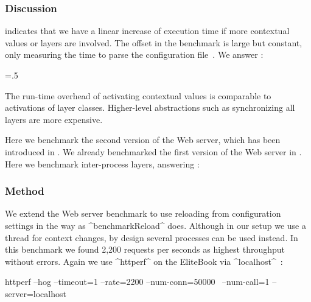 \subsubsection{Discussion}

 indicates that we have a linear increase of execution time if more contextual values or layers are involved.
The offset in the  benchmark is large but constant, only measuring the time to parse the configuration file~\cite{raab2016persistent}.
We answer :%
{\parfillskip=0pt \emergencystretch=.5\textwidth \par}
\rqEvaluationFrontendComparison*

\begin{finding}
The run-time overhead of activating contextual values is comparable to activations of layer classes.
Higher-level abstractions such as synchronizing all layers are more expensive.
\end{finding}










Here we benchmark the second version of the Web server, which has been introduced in .
We already benchmarked the first version of the Web server in .
Here we benchmark inter-process layers, answering :
\rqEvaluationFrontendEmbeddedActivation*

\subsubsection{Method}

We extend the Web server benchmark to use reloading from configuration settings in the way as ^benchmarkReload^ does.
Although in our setup we use a thread for context changes, by design several processes can be used instead.
In this benchmark we found 2,200 requests per seconds as highest throughput without errors.
Again we use ^httperf^ on the EliteBook via ^localhost^~\cite{raab2016persistent}:

\begin{code}[language=bash,numbers=none]
httperf --hog --timeout=1 --rate=2200 --num-conn=50000 \
        --num-call=1 --server=localhost
\end{code}


